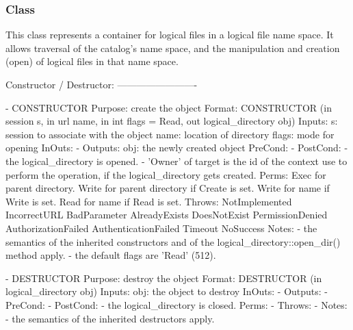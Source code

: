  
  \subsubsection*{Class }
 
    This class represents a container for logical files in a
    logical file name space.  It allows traversal of the
    catalog's name space, and the manipulation and creation
    (open) of logical files in that name space.
    
 \begin{myspec}
    Constructor / Destructor:
    -------------------------
 
    - CONSTRUCTOR
      Purpose:  create the object
      Format:   CONSTRUCTOR      (in  session       s,
                                  in  url           name,
                                  in  int           flags = Read,
                                  out logical_directory
                                                    obj)
      Inputs:   s:                session to associate with
                                  the object
                name:             location of directory
                flags:            mode for opening
      InOuts:   -
      Outputs:  obj:              the newly created object
      PreCond:  -
      PostCond: - the logical_directory is opened.
                - 'Owner' of target is the id of the context
                  use to perform the operation, if the
                  logical_directory gets created.
      Perms:    Exec  for parent directory.
                Write for parent directory if Create is set.
                Write for name if Write is set.
                Read  for name if Read  is set.
      Throws:   NotImplemented
                IncorrectURL
                BadParameter
                AlreadyExists
                DoesNotExist
                PermissionDenied
                AuthorizationFailed
                AuthenticationFailed
                Timeout
                NoSuccess
      Notes:    - the semantics of the inherited constructors
                  and of the logical_directory::open_dir()
                  method apply.
                - the default flags are 'Read' (512).
 
 
    - DESTRUCTOR
      Purpose:  destroy the object
      Format:   DESTRUCTOR         (in  logical_directory obj)
      Inputs:   obj:                the object to destroy
      InOuts:   -
      Outputs:  -
      PreCond:  -
      PostCond: - the logical_directory is closed.
      Perms:    -
      Throws:   -
      Notes:    - the semantics of the inherited destructors
                  apply.
 

\end{myspec}
